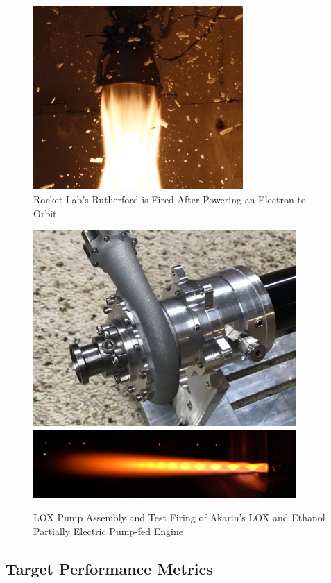\documentclass[12pt, letterpaper]{article}
\begin{document}
\FloatBarrier

\begin{figure}[H]
    \centering
    \includegraphics[width=8cm]{Images/Rutherford-Ignition3.jpg}
    \caption{Rocket Lab's Rutherford is Fired After Powering an Electron to Orbit}
\end{figure}

\begin{figure}[H]
    \centering
    \includegraphics[width=10cm]{Images/Pump_LOX_reddit.jpeg}
    \includegraphics[width=10cm]{Images/ElectricPumpFedReddit.jpg}
    \caption{LOX Pump Assembly and Test Firing of Akarin's LOX and Ethanol Partially Electric Pump-fed Engine}
\end{figure}


\FloatBarrier

\subsection{Target Performance Metrics}
\end{document}
